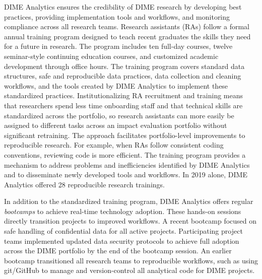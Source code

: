 DIME Analytics ensures the credibility of DIME research by developing best practices, providing implementation tools and workflows, and monitoring compliance across all research teams. Research assistants (RAs) follow a formal annual training program designed to teach recent graduates the skills they need for a future in research. The program includes ten full-day courses, twelve seminar-style continuing education courses, and customized academic development through office hours. The training program covers standard data structures, safe and reproducible data practices, data collection and cleaning workflows, and the tools created by DIME Analytics to implement these standardized practices. Institutionalizing RA recruitment and training means that researchers spend less time onboarding staff and that technical skills are standardized across the portfolio, so research assistants can more easily be assigned to different tasks across an impact evaluation portfolio without significant retraining. The approach facilitates portfolio-level improvements to reproducible research. For example, when RAs follow consistent coding conventions, reviewing code is more efficient. The training program provides a mechanism to address problems and inefficiencies identified by DIME Analytics and to disseminate newly developed tools and workflows. In 2019 alone, DIME Analytics offered 28 reproducible research trainings.

In addition to the standardized training program, DIME Analytics offers regular \emph{bootcamps} to achieve real-time technology adoption. These hands-on sessions directly transition projects to improved workflows. A recent bootcamp focused on safe handling of confidential data for all active projects. Participating project teams implemented updated data security protocols to achieve full adoption across the DIME portfolio by the end of the bootcamp session. An earlier bootcamp transitioned all research teams to reproducible workflows, such as using git/GitHub to manage and version-control all analytical code for DIME projects.

